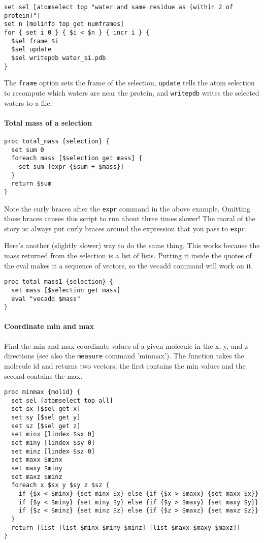 \begin{verbatim}
set sel [atomselect top "water and same residue as (within 2 of protein)"]
set n [molinfo top get numframes]
for { set i 0 } { $i < $n } { incr i } {
  $sel frame $i
  $sel update
  $sel writepdb water_$i.pdb
}
\end{verbatim}

The {\tt frame} option sets the frame of the selection, {\tt update} tells
the atom selection to recompute which waters are near the protein, and
{\tt writepdb} writes the selected waters to a file.  

\paragraph{Total mass of a selection}
\begin{verbatim}
proc total_mass {selection} {
  set sum 0
  foreach mass [$selection get mass] {
    set sum [expr {$sum + $mass}]
  }
  return $sum
}
\end{verbatim}
Note the curly braces after the {\tt expr} command in the above example.
Omitting those braces causes this script to run about three times slower!
The moral of the story is: always put curly braces around the expression
that you pass to {\tt expr}.

Here's another (slightly slower) way to do the same thing.  This works 
because
the mass returned from the selection is a list of lists.  Putting it
inside the quotes of the eval makes it a sequence of vectors, so the
vecadd command will work on it.
\begin{verbatim}
proc total_mass1 {selection} {
  set mass [$selection get mass]
  eval "vecadd $mass"
}
\end{verbatim}

\paragraph{Coordinate min and max}
Find the min and max coordinate values of a given molecule in the x,
y, and z directions (see also the {\tt measure} command 'minmax').  
 The
function takes the molecule id and returns two vectors; the first
contains the min values and the second contains the max.

\begin{verbatim}
proc minmax {molid} {
  set sel [atomselect top all]
  set sx [$sel get x]
  set sy [$sel get y]
  set sz [$sel get z]
  set minx [lindex $sx 0]
  set miny [lindex $sy 0]
  set minz [lindex $sz 0]
  set maxx $minx
  set maxy $miny
  set maxz $minz
  foreach x $sx y $sy z $sz {
    if {$x < $minx} {set minx $x} else {if {$x > $maxx} {set maxx $x}}
    if {$y < $miny} {set miny $y} else {if {$y > $maxy} {set maxy $y}}
    if {$z < $minz} {set minz $z} else {if {$z > $maxz} {set maxz $z}}
  }
  return [list [list $minx $miny $minz] [list $maxx $maxy $maxz]]
}
\end{verbatim}


